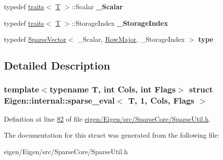 \begin{DoxyCompactItemize}
typedef \hyperlink{struct_eigen_1_1internal_1_1traits}{traits}$<$ \hyperlink{group___sparse_core___module}{T} $>$\+::Scalar {\bfseries \+\_\+\+Scalar}
\item 
\mbox{\label{struct_eigen_1_1internal_1_1sparse__eval_3_01_t_00_011_00_01_cols_00_01_flags_01_4_ae04531ef2d607818bf5fc2797943da5b}} 
typedef \hyperlink{struct_eigen_1_1internal_1_1traits}{traits}$<$ \hyperlink{group___sparse_core___module}{T} $>$\+::Storage\+Index {\bfseries \+\_\+\+Storage\+Index}
\item 
\mbox{\label{struct_eigen_1_1internal_1_1sparse__eval_3_01_t_00_011_00_01_cols_00_01_flags_01_4_a4652d925d593f6f613d6e43197f33c42}} 
typedef \hyperlink{group___sparse_core___module_class_eigen_1_1_sparse_vector}{Sparse\+Vector}$<$ \+\_\+\+Scalar, \hyperlink{group__enums_ggaacded1a18ae58b0f554751f6cdf9eb13acfcde9cd8677c5f7caf6bd603666aae3}{Row\+Major}, \+\_\+\+Storage\+Index $>$ {\bfseries type}
\end{DoxyCompactItemize}


\subsection{Detailed Description}
\subsubsection*{template$<$typename T, int Cols, int Flags$>$\newline
struct Eigen\+::internal\+::sparse\+\_\+eval$<$ T, 1, Cols, Flags $>$}



Definition at line \hyperlink{eigen_2_eigen_2src_2_sparse_core_2_sparse_util_8h_source_l00082}{82} of file \hyperlink{eigen_2_eigen_2src_2_sparse_core_2_sparse_util_8h_source}{eigen/\+Eigen/src/\+Sparse\+Core/\+Sparse\+Util.\+h}.



The documentation for this struct was generated from the following file\+:\begin{DoxyCompactItemize}
\item 
eigen/\+Eigen/src/\+Sparse\+Core/\+Sparse\+Util.\+h\end{DoxyCompactItemize}
